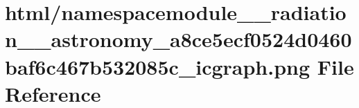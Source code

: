 \hypertarget{namespacemodule____radiation____astronomy__a8ce5ecf0524d0460baf6c467b532085c__icgraph_8png}{}\section{html/namespacemodule\+\_\+\+\_\+radiation\+\_\+\+\_\+astronomy\+\_\+a8ce5ecf0524d0460baf6c467b532085c\+\_\+icgraph.png File Reference}
\label{namespacemodule____radiation____astronomy__a8ce5ecf0524d0460baf6c467b532085c__icgraph_8png}
